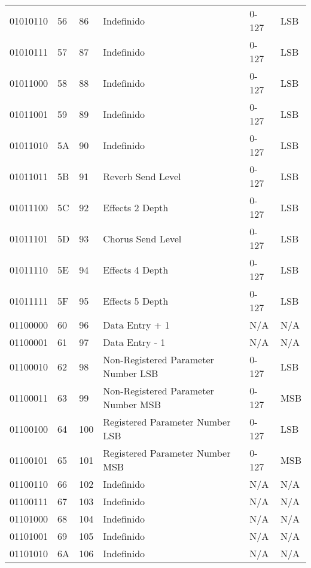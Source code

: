 \begin{center}
\begin{supertabular}{| C{2cm} | C{1.5cm} | C{1.5cm} | C{5.3cm} | C{1.5cm} | C{1.5cm} |}
             01010110 & 56 & 86  & Indefinido & 0-127 & LSB \\
                01010111 & 57 & 87  & Indefinido & 0-127 & LSB \\
             01011000 & 58 & 88  & Indefinido & 0-127 & LSB \\
                01011001 & 59 & 89  & Indefinido & 0-127 & LSB \\
             01011010 & 5A & 90  & Indefinido & 0-127 & LSB \\
                01011011 & 5B & 91  & Reverb Send Level & 0-127 & LSB \\
             01011100 & 5C & 92  & Effects 2 Depth & 0-127 & LSB \\
                01011101 & 5D & 93  & Chorus Send Level & 0-127 & LSB \\
             01011110 & 5E & 94  & Effects 4 Depth & 0-127 & LSB \\
                01011111 & 5F & 95  & Effects 5 Depth & 0-127 & LSB \\
             01100000 & 60 & 96  & Data Entry + 1 & N/A & N/A \\
                01100001 & 61 & 97  & Data Entry - 1 & N/A & N/A \\
             01100010 & 62 & 98  & Non-Registered Parameter Number LSB & 0-127 & LSB \\
                01100011 & 63 & 99  & Non-Registered Parameter Number MSB & 0-127 & MSB \\
             01100100 & 64 & 100 & Registered Parameter Number LSB & 0-127 & LSB \\
                01100101 & 65 & 101 & Registered Parameter Number MSB & 0-127 & MSB \\
             01100110 & 66 & 102 & Indefinido & N/A & N/A \\
                01100111 & 67 & 103 & Indefinido & N/A & N/A \\
             01101000 & 68 & 104 & Indefinido & N/A & N/A \\
                01101001 & 69 & 105 & Indefinido & N/A & N/A \\
             01101010 & 6A & 106 & Indefinido & N/A & N/A \\

\end{supertabular}
\end{center}
